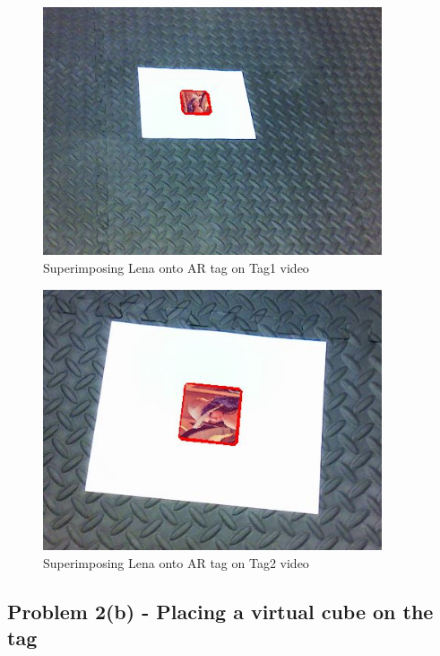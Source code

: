 \documentclass[12pt]{article}
\begin{document}
\begin{enumerate}
\begin{figure}[h]
    \centering
    \includegraphics[width=10cm]{Tag1_videooutput}
    \caption{Superimposing Lena onto AR tag on Tag1 video}
    \label{fig:video frame output}
\end{figure}
\newpage
\begin{figure}[h]
    \centering
    \includegraphics[width=10cm]{Tag2_videooutput}
    \caption{Superimposing Lena onto AR tag on Tag2 video}
    \label{fig:video frame output}
\end{figure}
\end{enumerate}

\subsection{Problem 2(b) - Placing a virtual cube on the tag}
\end{document}
